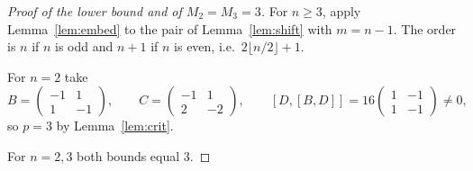 \documentclass[11pt]{article}
\theoremstyle{remark}
\begin{document}
\begin{proof}[Proof of the lower bound and of $M_2=M_3=3$]
For $n\ge3$, apply Lemma~\ref{lem:embed} to the pair of
Lemma~\ref{lem:shift} with $m=n-1$. The order is $n$ if $n$ is odd and
$n+1$ if $n$ is even, i.e.\ $2\lfloor n/2\rfloor+1$.

For $n=2$ take
$$
B=\begin{pmatrix}-1&1\\1&-1\end{pmatrix},\qquad
C=\begin{pmatrix}-1&1\\2&-2\end{pmatrix},\qquad
[D,[B,D]]=16\begin{pmatrix}1&-1\\1&-1\end{pmatrix}\ne0,
$$
so $p=3$ by Lemma~\ref{lem:crit}.

For $n=2,3$ both bounds equal $3$.
\end{proof}
\end{document}
